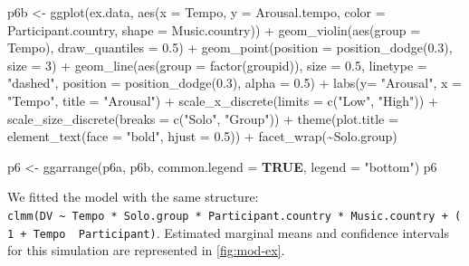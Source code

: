 \documentclass[
  bookmarksnumbered]{article}
\newenvironment{Shaded}{\begin{snugshade}}{\end{snugshade}}
\newcommand{\AttributeTok}[1]{\textcolor[rgb]{0.80,0.80,0.80}{#1}}
\newcommand{\ConstantTok}[1]{\textcolor[rgb]{0.86,0.64,0.64}{\textbf{#1}}}
\newcommand{\DecValTok}[1]{\textcolor[rgb]{0.86,0.86,0.80}{#1}}
\newcommand{\FloatTok}[1]{\textcolor[rgb]{0.75,0.75,0.82}{#1}}
\newcommand{\FunctionTok}[1]{\textcolor[rgb]{0.94,0.94,0.56}{#1}}
\newcommand{\NormalTok}[1]{\textcolor[rgb]{0.80,0.80,0.80}{#1}}
\newcommand{\OtherTok}[1]{\textcolor[rgb]{0.94,0.94,0.56}{#1}}
\newcommand{\SpecialCharTok}[1]{\textcolor[rgb]{0.86,0.64,0.64}{#1}}
\newcommand{\StringTok}[1]{\textcolor[rgb]{0.80,0.58,0.58}{#1}}
\begin{document}
\begin{Shaded}
\begin{Highlighting}[]
\NormalTok{p6b }\OtherTok{\textless{}{-}} \FunctionTok{ggplot}\NormalTok{(ex.data, }\FunctionTok{aes}\NormalTok{(}\AttributeTok{x =}\NormalTok{ Tempo, }\AttributeTok{y =}\NormalTok{ Arousal.tempo, }\AttributeTok{color =}\NormalTok{ Participant.country, }\AttributeTok{shape =}\NormalTok{ Music.country)) }\SpecialCharTok{+}
   \FunctionTok{geom\_violin}\NormalTok{(}\FunctionTok{aes}\NormalTok{(}\AttributeTok{group =}\NormalTok{ Tempo), }\AttributeTok{draw\_quantiles =} \FloatTok{0.5}\NormalTok{) }\SpecialCharTok{+}
  \FunctionTok{geom\_point}\NormalTok{(}\AttributeTok{position =} \FunctionTok{position\_dodge}\NormalTok{(}\FloatTok{0.3}\NormalTok{), }\AttributeTok{size =} \DecValTok{3}\NormalTok{) }\SpecialCharTok{+}
  \FunctionTok{geom\_line}\NormalTok{(}\FunctionTok{aes}\NormalTok{(}\AttributeTok{group =} \FunctionTok{factor}\NormalTok{(groupid)), }\AttributeTok{size =} \FloatTok{0.5}\NormalTok{, }\AttributeTok{linetype =} \StringTok{"dashed"}\NormalTok{, }\AttributeTok{position =} \FunctionTok{position\_dodge}\NormalTok{(}\FloatTok{0.3}\NormalTok{), }\AttributeTok{alpha =} \FloatTok{0.5}\NormalTok{) }\SpecialCharTok{+}
  \FunctionTok{labs}\NormalTok{(}\AttributeTok{y=} \StringTok{"Arousal"}\NormalTok{, }\AttributeTok{x =} \StringTok{"Tempo"}\NormalTok{, }\AttributeTok{title =} \StringTok{"Arousal"}\NormalTok{) }\SpecialCharTok{+}
  \FunctionTok{scale\_x\_discrete}\NormalTok{(}\AttributeTok{limits =} \FunctionTok{c}\NormalTok{(}\StringTok{"Low"}\NormalTok{, }\StringTok{"High"}\NormalTok{)) }\SpecialCharTok{+} 
  \FunctionTok{scale\_size\_discrete}\NormalTok{(}\AttributeTok{breaks =} \FunctionTok{c}\NormalTok{(}\StringTok{"Solo"}\NormalTok{, }\StringTok{"Group"}\NormalTok{)) }\SpecialCharTok{+} 
  \FunctionTok{theme}\NormalTok{(}\AttributeTok{plot.title =} \FunctionTok{element\_text}\NormalTok{(}\AttributeTok{face =} \StringTok{"bold"}\NormalTok{, }\AttributeTok{hjust =} \FloatTok{0.5}\NormalTok{)) }\SpecialCharTok{+} 
  \FunctionTok{facet\_wrap}\NormalTok{(}\SpecialCharTok{\textasciitilde{}}\NormalTok{Solo.group)}

\NormalTok{p6 }\OtherTok{\textless{}{-}} \FunctionTok{ggarrange}\NormalTok{(p6a, p6b,}
                \AttributeTok{common.legend =} \ConstantTok{TRUE}\NormalTok{,}
                \AttributeTok{legend =} \StringTok{"bottom"}\NormalTok{)}
\NormalTok{p6}
\end{Highlighting}
\end{Shaded}

We fitted the model with the same structure: \texttt{clmm(DV\ \textasciitilde{}\ Tempo\ *\ Solo.group\ *\ Participant.country\ *\ Music.country\ +\ (1\ +\ Tempo\ \textbar{}\ Participant)}. Estimated marginal means and confidence intervals for this simulation are represented in \ref{fig:mod-ex}.
\end{document}
